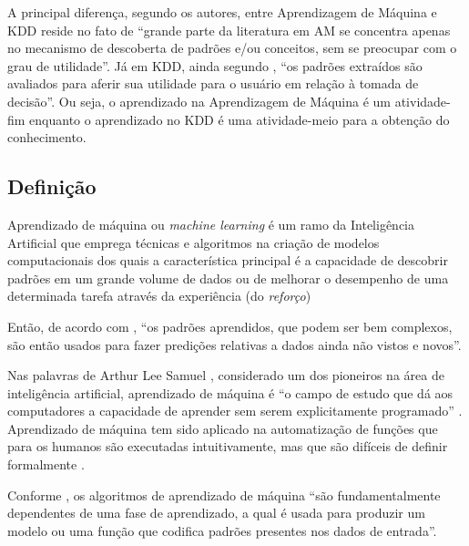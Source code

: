 A principal diferença, segundo os autores,  entre Aprendizagem de Máquina e KDD reside no fato de ``grande parte da literatura em AM se concentra apenas no mecanismo de descoberta de padrões e/ou conceitos, sem se preocupar com o grau de utilidade''. Já em KDD, ainda segundo , ``os padrões extraídos são avaliados para aferir sua utilidade para o usuário em relação à tomada de decisão''. Ou seja, o aprendizado na Aprendizagem de Máquina é um atividade-fim enquanto o aprendizado no KDD é uma atividade-meio para a obtenção do conhecimento.

\subsection{Definição}
Aprendizado de máquina ou \textit{machine learning} é um ramo da Inteligência Artificial que emprega técnicas e algoritmos na criação de modelos computacionais dos quais a característica principal é a capacidade de descobrir padrões em um grande volume de dados ou de melhorar o desempenho de uma determinada tarefa através da experiência (do \textit{reforço}) \cite{mohri_foundations_2018, alpaydin_introduction_2014, swamynathan_mastering_2019}

Então, de acordo com , ``os padrões aprendidos, que podem ser bem complexos, são então usados para fazer predições relativas a dados ainda não vistos e novos''.

Nas palavras de Arthur Lee Samuel , considerado um dos pioneiros na área de inteligência artificial, aprendizado de máquina é ``o campo de estudo que dá aos computadores a capacidade de aprender sem serem explicitamente programado'' \cite[p. 89]{simon_too_2013}. Aprendizado de máquina tem sido aplicado na automatização de funções que para os humanos são executadas intuitivamente, mas que são difíceis de definir formalmente \cite{sarkar_2017}.

Conforme , os algoritmos de aprendizado de máquina ``são fundamentalmente dependentes de uma fase de aprendizado, a qual é usada para produzir um modelo ou uma função que codifica padrões presentes nos dados de entrada''.

